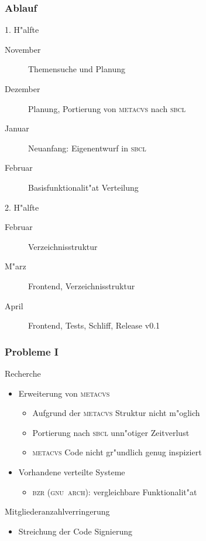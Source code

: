 \documentclass[german, presentation]{beamer}
\begin{document}
\begin{frame} \frametitle{Ablauf}
  \begin{block}{1. H"alfte}
    \begin{description}
    \item[November] Themensuche und Planung
    \item[Dezember] Planung, Portierung von \textsc{metacvs} nach \textsc{sbcl}
    \item[Januar] Neuanfang: Eigenentwurf in \textsc{sbcl}
    \item[Februar] Basisfunktionalit"at Verteilung
    \end{description}
  \end{block}
  \begin{block}{2. H"alfte}
    \begin{description}
    \item[Februar] Verzeichnisstruktur
    \item[M"arz] Frontend, Verzeichnisstruktur
    \item[April] Frontend, Tests, Schliff, Release v0.1
    \end{description}
  \end{block}
\end{frame}


\begin{frame} \frametitle{Probleme I}
  \begin{block}{Recherche}
    \begin{itemize}
    \item Erweiterung von \textsc{metacvs}
      \begin{itemize}
      \item Aufgrund der \textsc{metacvs} Struktur nicht m"oglich
      \item Portierung nach \textsc{sbcl} unn"otiger Zeitverlust
      \item \textsc{metacvs} Code nicht gr"undlich genug inspiziert
      \end{itemize}
    \item Vorhandene verteilte Systeme
      \begin{itemize}
        \item \textsc{bzr} (\textsc{gnu~arch}): vergleichbare Funktionalit"at
      \end{itemize}
    \end{itemize}
  \end{block}
  \begin{block}{Mitgliederanzahlverringerung}
    \begin{itemize}
    \item Streichung der Code Signierung
    \end{itemize}
  \end{block}
\end{frame}
\end{document}
